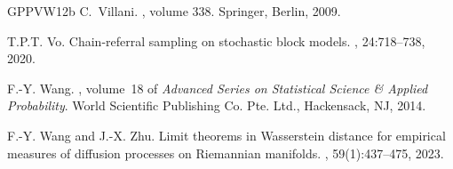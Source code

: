 \documentclass[10pt,a4paper]{article}
\begin{document}
{\begin{thebibliography}{GPPVW12b}
C.~Villani.
, volume 338.
\newblock Springer, Berlin, 2009.

T.P.T. Vo.
\newblock Chain-referral sampling on stochastic block models.
, 24:718--738, 2020.

F.-Y. Wang.
,
  volume~18 of {\em Advanced Series on Statistical Science \& Applied
  Probability}.
\newblock World Scientific Publishing Co. Pte. Ltd., Hackensack, NJ, 2014.

F.-Y. {Wang} and J.-X. {Zhu}.
\newblock Limit theorems in {Wasserstein} distance for empirical measures of
  diffusion processes on {Riemannian} manifolds.
, 59(1):437--475,
  2023.

\end{thebibliography}
}
\end{document}

